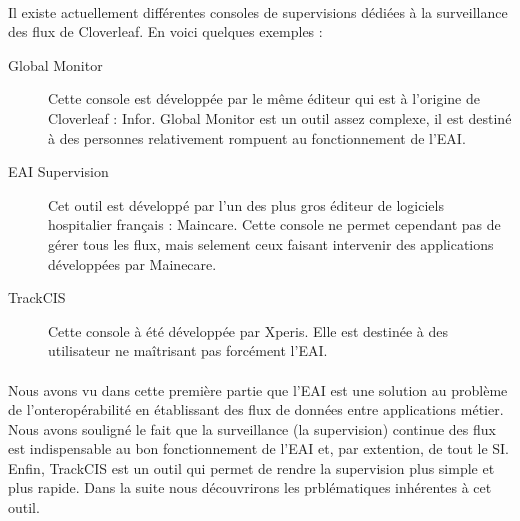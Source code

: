 			\paragraph{}%
			Il existe actuellement différentes consoles de supervisions dédiées à la
			surveillance des flux de Cloverleaf. En voici quelques exemples :
			\begin{description}
				\item[Global Monitor] Cette console est développée par le même éditeur qui
				est à l'origine de Cloverleaf : Infor. Global Monitor est un outil assez
				complexe, il est destiné à des personnes relativement rompuent au
				fonctionnement de l'EAI.
				\item[EAI Supervision] Cet outil est développé par l'un des plus gros
				éditeur de logiciels hospitalier français : Maincare. Cette console ne
				permet cependant pas de gérer tous les flux, mais selement ceux faisant
				intervenir des applications développées par Mainecare.
				\item[TrackCIS] Cette console à été développée par Xperis. Elle est destinée
				à des utilisateur ne maîtrisant pas forcément l'EAI.
			\end{description}
			
			\paragraph{}%
			
			
			\paragraph{}%
			
		
		\paragraph{}%
		Nous avons vu dans cette première partie que l'EAI est une solution au
		problème de l'onteropérabilité en établissant des flux de données entre
		applications métier. Nous avons souligné le fait que la surveillance (la
		supervision) continue des flux est indispensable au bon fonctionnement de
		l'EAI et, par extention, de tout le SI. Enfin, TrackCIS est un outil qui
		permet de rendre la supervision plus simple et plus rapide.\newline
		Dans la suite nous découvrirons les prblématiques inhérentes à cet outil.
		
